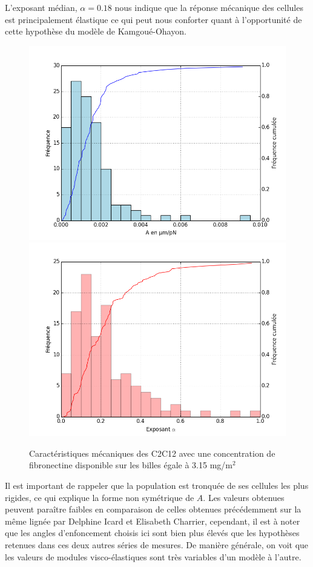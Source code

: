 L'exposant médian, $\alpha=0.18$ nous indique que la réponse mécanique des cellules est principalement élastique ce qui peut nous conforter quant à l'opportunité de cette hypothèse du modèle de Kamgoué-Ohayon.


\begin{figure}
\includegraphics[scale=0.5]{Figures/A0_Toutes.png} 
\includegraphics[scale=0.5]{Figures/E0_Toutes.png} 
\caption{Caractéristiques mécaniques des C2C12 avec une concentration de fibronectine disponible sur les billes égale à 3.15 mg/m$^2$}
\end{figure}
 
  
Il est important de rappeler que la population est tronquée de ses cellules les plus rigides, ce qui explique la forme non symétrique de $A$. 
Les valeurs obtenues peuvent paraître faibles en comparaison de celles obtenues précédemment sur la même lignée par Delphine Icard et Elisabeth Charrier, cependant, il est à noter que les angles d'enfoncement choisis ici sont bien plus élevés que les hypothèses retenues dans ces deux autres séries de mesures. De manière générale, on voit que les valeurs de modules visco-élastiques sont très variables d'un modèle à l'autre. 

